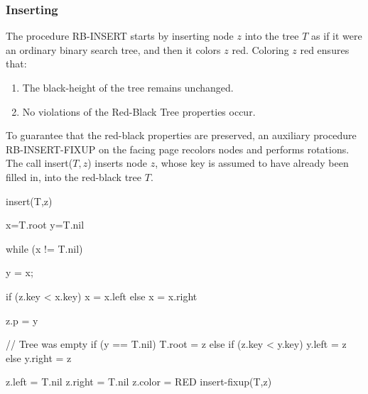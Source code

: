 \documentclass{report}
\begin{document}
 \pagebreak 
 \subsubsection{Inserting}
 \bigbreak \noindent 
 The procedure RB-INSERT starts by inserting node $z$ into the tree $T$ as if it were an ordinary binary search tree, and then it colors $z$ red.
 \bigbreak \noindent 
 Coloring $z$ red ensures that:
 \begin{enumerate}
     \item The black-height of the tree remains unchanged.
     \item No violations of the Red-Black Tree properties occur.
 \end{enumerate}
 \bigbreak \noindent 
To guarantee that the red-black properties are preserved, an auxiliary procedure RB-INSERT-FIXUP on the facing page recolors nodes and performs rotations.
\bigbreak \noindent 
The call insert($T,z$) inserts node $z$, whose key is assumed to have
already been filled in, into the red-black tree $T$.
\bigbreak \noindent 
\begin{cppcode}
    insert(T,z) {
        x=T.root
        y=T.nil

        while (x != T.nil) {
            y = x;

            if (z.key < x.key) {
                x = x.left
            } else x = x.right
        }
        z.p = y

        // Tree was empty
        if (y == T.nil) {
            T.root = z
        } else if (z.key < y.key) {
            y.left = z
        } else y.right = z
        
        z.left = T.nil
        z.right = T.nil
        z.color = RED
        insert-fixup(T,z)
            
    }
\end{cppcode}
\end{document}
